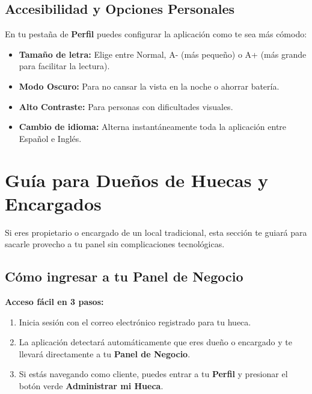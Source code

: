 \documentclass[11pt, a4paper, oneside]{article}
\begin{document}
\subsection{Accesibilidad y Opciones Personales}
En tu pestaña de \textbf{Perfil} puedes configurar la aplicación como te sea más cómodo:
\begin{itemize}
  \item \textbf{Tamaño de letra:} Elige entre Normal, A- (más pequeño) o A+ (más grande para facilitar la lectura).
  \item \textbf{Modo Oscuro:} Para no cansar la vista en la noche o ahorrar batería.
  \item \textbf{Alto Contraste:} Para personas con dificultades visuales.
  \item \textbf{Cambio de idioma:} Alterna instantáneamente toda la aplicación entre Español e Inglés.
\end{itemize}

\section{Guía para Dueños de Huecas y Encargados}

Si eres propietario o encargado de un local tradicional, esta sección te guiará para sacarle provecho a tu panel sin complicaciones tecnológicas.

\subsection{Cómo ingresar a tu Panel de Negocio}
\begin{stepbox}
\textbf{Acceso fácil en 3 pasos:}
\begin{enumerate}
  \item Inicia sesión con el correo electrónico registrado para tu hueca.
  \item La aplicación detectará automáticamente que eres dueño o encargado y te llevará directamente a tu \textbf{Panel de Negocio}.
  \item Si estás navegando como cliente, puedes entrar a tu \textbf{Perfil} y presionar el botón verde \textbf{Administrar mi Hueca}.
\end{enumerate}
\end{stepbox}
\end{document}
